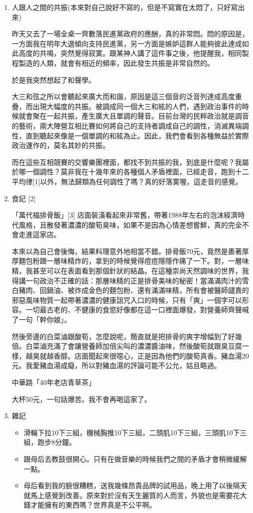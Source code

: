 \documentclass[
]{article}
\providecommand{\tightlist}{%
  \setlength{\itemsep}{0pt}\setlength{\parskip}{0pt}}
\begin{document}
\begin{enumerate}
\def\labelenumi{\arabic{enumi}.}
\item
  人跟人之間的共振(本來對自己說好不寫的，但是不寫實在太悶了，只好寫出來)

  昨天又去了一場全桌一齊數落民進黨政府的應酬，真的非常悶。悶的原因是，一方面我在明年大選傾向支持民進黨，另一方面是嫉妒這群人能夠彼此達成如此高度的共鳴，突然覺得寂寞。跟某神人講了這件事之後，他提醒我，相同製程製造的人類，就會有相近的頻率，因此發生共振是非常自然的。

  於是我突然想起了和聲學。

  大三和弦之所以會聽起來廣大而和諧，原因是這三個音的泛音列達成高度重疊，而出現大幅度的共振。被調成同一個大三和絃的人們，遇到政治事件的時候就會聚在一起共振，產生廣大且單調的聲音。目前台灣的民粹政治就是調音的藝術，兩大陣營互相比賽如何將自己的支持者調成自己的調性，消滅異端調性，直到聽起來像是一個單調的和絃為止。因此，我們會看到各種無益於實際政治運作的，莫名其妙的共振。

  而在這些互相競賽的交響樂團裡面，都找不到共振的我，到底是什麼呢？我屬於哪一個調性？莫非我在十幾年來的各種個人矛盾裡面，已經走音，跑到十二平均律{[}1{]}以外，無法歸類為任何調性了嗎？真的好落寞喔，這走音的感覺。
\item
  食記 {[}2{]}

  「萬代福排骨飯」{[}3{]}
  店面裝潢看起來非常舊，帶著1988年左右的泡沫經濟時代風格，且散發著濃濃的酸筍臭味，如果不是因為心情差想嘗鮮，真的完全不會走進這家店。

  本來以為自己會後悔，結果料理意外地相當不錯。排骨飯70元，竟然是裹著厚厚麵包粉跟一層味精炸的，拿到的時候覺得痘痘隱隱作痛了一下。對，一層味精，我甚至可以在表面看到那個針狀的結晶。在這種崇尚天然調味的世界，我得講一句政治不正確的話：那層味精的正是排骨美味的秘密！當滿滿肉汁的雪白豬肉、回鍋油、被炸成金色的麵包粉、還有滿滿味精，所有會被醫師譴責的邪惡風味物質一起帶著濃濃的健康詛咒入口的時候，只有「爽」一個字可以形容。一切最古老的、不健康的食慾好像都在這一口裡面爆發，對營養師齊聲喊了一句「幹你娘」。

  然後旁邊的白菜滷跟酸筍，怎麼說呢，簡直就是把排骨的爽字增幅到了好幾倍。白菜滷充滿了會讓營養師加倍尖叫的濃濃醬油味，然後酸筍就跟臭豆腐一樣，越臭就越香醇。店面聞起來很噁心，正是因為他們的酸筍真香。豬血湯20元。我愛豬血湯成癡，所以對豬血湯的評論可能不公允，姑且略過。

  中華路「40年老店青草茶」

  大杯50元，一句話爆苦。我不會再喝這家了。
\item
  雜記

  \begin{itemize}
  \tightlist
  \item
    滑輪下拉10下三組，機械胸推10下三組，二頭肌10下三組，三頭肌10下三組，跑步8分鐘。
  \item
    跟母后去教鼓很開心。只有在做音樂的時候我們之間的矛盾才會稍微緩解一點。
  \item
    母后看到我的臉很糟糕，送我幾條昂貴品牌的試用品，晚上用了以後隔天就馬上感覺到改善。原來對於沒有天生麗質的人而言，外貌也是需要花大錢才能擁有的東西嗎？世界真是不公平啊。
  \end{itemize}
\end{enumerate}
\end{document}
